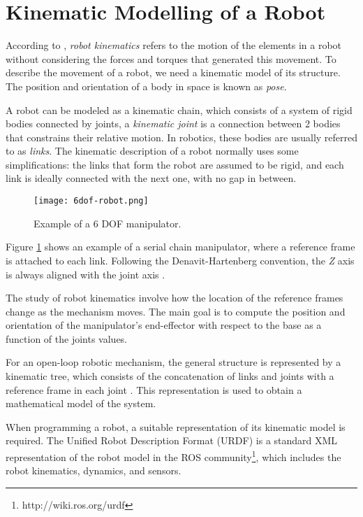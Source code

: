 \section{Kinematic Modelling of a Robot}

According to \citet{Handbook}, \textit{robot kinematics} refers to the motion of the elements in a robot without considering the forces and torques that generated this movement. 
To describe the movement of a robot, we need a kinematic model of its structure. The position and orientation of a body  in space is known as \textit{pose}.

A robot can be modeled as a kinematic chain, which consists of a system of rigid bodies connected by joints, a \textit{kinematic joint} is a connection between 2 bodies that constrains their relative motion. In robotics, these bodies are usually referred to as \textit{links}.  The kinematic description of a robot normally uses some simplifications: the links that form the robot are assumed to be rigid, and each link is ideally connected with the next one, with no gap in between.
\begin{figure}[H]
	\centering
	\texttt{[image: 6dof-robot.png]}
	\vspace{-10pt}
	\caption[Example of a 6 DOF manipulator]{Example of a 6 DOF manipulator. \citep[chap. 1, page 24]{Handbook}}
	\vspace{-15pt}
	\label{fig:kinematic}
\end{figure}

Figure \ref{fig:kinematic} shows an example of a serial chain manipulator, where a reference frame is attached to each link. Following the Denavit-Hartenberg convention, the \textit{Z} axis is always aligned with the joint axis \citep{Craig}.

The study of robot kinematics involve how the location of the reference frames change as the mechanism moves. The main goal is to compute the position and orientation of the manipulator's end-effector with respect to the base as a function of the joints values.

For an open-loop robotic mechanism, the general structure is represented by a kinematic tree, which consists of the concatenation of links and joints with a reference frame in each joint \citep{Handbook}. This representation is used to obtain a mathematical model of the system. 

When programming a robot, a suitable representation of its kinematic model is required. The Unified Robot Description Format (URDF) is a standard XML representation of the robot model in the ROS community\footnote{http://wiki.ros.org/urdf}, which includes the robot kinematics, dynamics, and sensors. %

